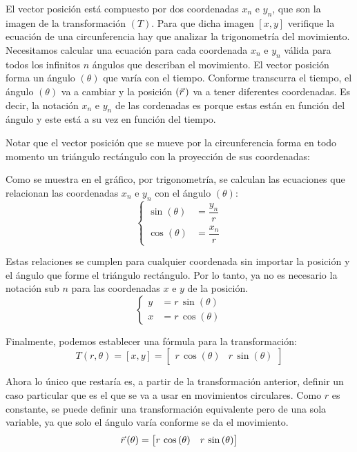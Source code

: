 \documentclass[a5paper,12pt,twoside]{book}
\begin{document}
El vector posición está compuesto por dos coordenadas $x_n$ e $y_n$, que son la imagen de la transformación $(T)$.
Para que dicha imagen $[x,y]$ verifique la ecuación de una circunferencia hay que analizar la trigonometría del movimiento.
Necesitamos calcular una ecuación para cada coordenada $x_n$ e $y_n$ válida para todos los infinitos $n$ ángulos que describan el movimiento.
El vector posición forma un ángulo $(\theta)$ que varía con el tiempo.
Conforme transcurra el tiempo, el ángulo $(\theta)$ va a cambiar y la posición $(\vec{r}\hspace{0.05cm})$ va a tener diferentes coordenadas.
Es decir, la notación $x_n$ e $y_n$ de las cordenadas es porque estas están en función del ángulo y este está a su vez en función del tiempo.

Notar que el vector posición que se mueve por la circunferencia forma en todo momento un triángulo rectángulo con la proyección de sus coordenadas:

\begin{center}
    \def\svgwidth{0.4\linewidth}
    
\end{center}

Como se muestra en el gráfico, por trigonometría, se calculan las ecuaciones que relacionan las coordenadas $x_n$ e $y_n$ con el ángulo $(\theta)$:
\[
  \left\{
    \begin{aligned}
      \sin{(\theta)} &= \dfrac{y_n}{r}
      \\[1ex]
      \cos{(\theta)} &= \dfrac{x_n}{r}
    \end{aligned}
  \right.
\]

Estas relaciones se cumplen para cualquier coordenada sin importar la posición y el ángulo que forme el triángulo rectángulo.
Por lo tanto, ya no es necesario la notación sub $n$ para las coordenadas $x$ e $y$ de la posición.
\[
  \left\{
    \begin{aligned}
      y &= r \, \sin{(\theta)}
      \\
      x &= r \, \cos{(\theta)}
    \end{aligned}
  \right.
\]

Finalmente, podemos establecer una fórmula para la transformación:
\[
  T(r, \theta) = [x,y] =
  \begin{bmatrix}
      r \, \cos{(\theta)} & r \, \sin{(\theta)}
  \end{bmatrix}
\]

Ahora lo único que restaría es, a partir de la transformación anterior, definir un caso particular que es el que se va a usar en movimientos circulares.
Como $r$ es constante, se puede definir una transformación equivalente pero de una sola variable, ya que solo el ángulo varía conforme se da el movimiento.
\[ \vec{r}\hspace{0.05cm}(\theta) = \begin{bmatrix} r \, \cos{(\theta)} & r \, \sin{(\theta)} \end{bmatrix} \]
\end{document}
